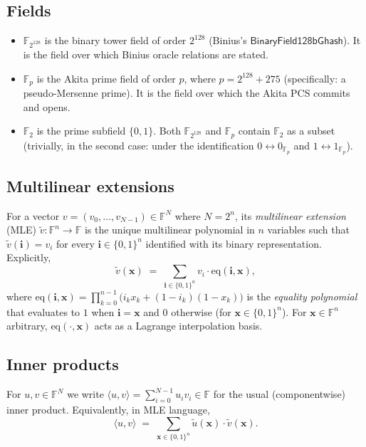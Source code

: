 \documentclass[11pt,a4paper]{article}
\theoremstyle{definition}
\theoremstyle{remark}
\newcommand{\binF}{\mathbb{F}_{2^{128}}}        %
\newcommand{\akF}{\mathbb{F}_{p}}                %
\newcommand{\F}{\mathbb{F}}                       %
\newcommand{\GF}[1]{\mathbb{F}_{#1}}             %
\newcommand{\eq}{\mathrm{eq}}                    %
\newcommand{\MLE}[1]{\widetilde{#1}}              %
\newcommand{\bits}{\{0,1\}}
\begin{document}
\subsection*{Fields}

\begin{itemize}[leftmargin=*, itemsep=2pt]
  \item $\binF$ is the binary tower field of order $2^{128}$ (Binius's
        $\mathsf{BinaryField128bGhash}$). It is the field over which
        Binius oracle relations are stated.
  \item $\akF$ is the Akita prime field of order $p$, where
        $p = 2^{128} + 275$ (specifically: a pseudo-Mersenne prime). It
        is the field over which the Akita PCS commits and opens.
  \item $\GF{2}$ is the prime subfield $\{0, 1\}$. Both $\binF$ and
        $\akF$ contain $\GF{2}$ as a subset (trivially, in the second
        case: under the identification $0 \leftrightarrow 0_{\akF}$ and
        $1 \leftrightarrow 1_{\akF}$).
\end{itemize}

\subsection*{Multilinear extensions}

For a vector $v = (v_0, \ldots, v_{N-1}) \in \F^{N}$ where $N = 2^n$, its
\emph{multilinear extension} (MLE) $\MLE{v} : \F^n \to \F$ is the unique
multilinear polynomial in $n$ variables such that
$\MLE{v}(\mathbf{i}) = v_i$ for every $\mathbf{i} \in \bits^n$ identified
with its binary representation. Explicitly,
\[
  \MLE{v}(\mathbf{x}) \;=\; \sum_{\mathbf{i} \in \bits^n}
    v_i \cdot \eq(\mathbf{i}, \mathbf{x}),
\]
where $\eq(\mathbf{i}, \mathbf{x}) = \prod_{k=0}^{n-1} \bigl(i_k x_k
+ (1 - i_k)(1 - x_k)\bigr)$ is the \emph{equality polynomial} that
evaluates to $1$ when $\mathbf{i} = \mathbf{x}$ and $0$ otherwise (for
$\mathbf{x} \in \bits^n$). For $\mathbf{x} \in \F^n$ arbitrary,
$\eq(\cdot, \mathbf{x})$ acts as a Lagrange interpolation basis.

\subsection*{Inner products}

For $u, v \in \F^N$ we write $\langle u, v \rangle = \sum_{i=0}^{N-1}
u_i v_i \in \F$ for the usual (componentwise) inner product.
Equivalently, in MLE language,
\[
  \langle u, v \rangle \;=\; \sum_{\mathbf{x} \in \bits^n}
    \MLE{u}(\mathbf{x}) \cdot \MLE{v}(\mathbf{x}).
\]
\end{document}
